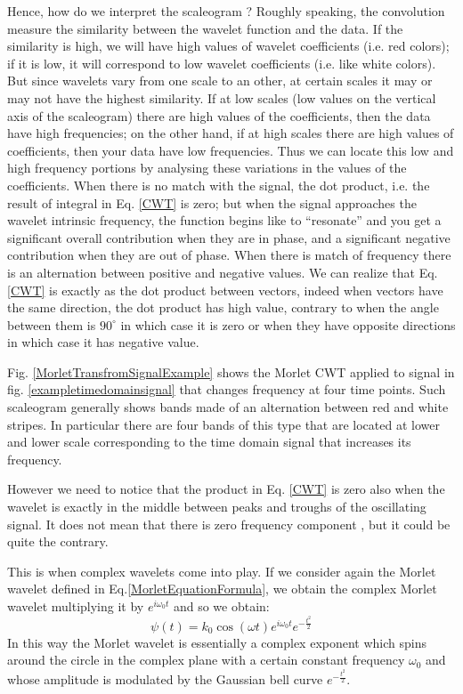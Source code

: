 \documentclass[12pt,a4paper]{report}
\begin{document}
Hence, how do we interpret the scaleogram ? Roughly speaking, the convolution measure the similarity between the wavelet function and the data. If the similarity is high, we will have high values of wavelet coefficients (i.e. red colors); if it is low, it will correspond to low wavelet coefficients (i.e. like white colors). But since wavelets vary from one scale to an other, at certain scales it may or may not have the highest similarity. If at low scales (low values on the vertical axis of the scaleogram) there are high values of the coefficients, then the data have high frequencies; on the other hand, if at high scales there are high values of coefficients, then your data have low frequencies. Thus we can locate this low and high frequency portions by analysing these variations in the values of the coefficients. When there is no match with the signal, the dot product, i.e. the result of integral in Eq. \ref{CWT} is zero; but when the signal approaches the wavelet intrinsic frequency, the function begins like to ``resonate'' and you get a significant overall contribution when they are in phase, and a significant negative contribution when they are out of phase. When there is match of frequency there is an alternation between positive and negative values. We can realize that Eq. \ref{CWT} is exactly as the dot product between vectors, indeed when vectors have the same direction, the dot product has high value, contrary to when the angle between them is $90^{\circ}$ in which case it is zero or when they have opposite directions in which case it has negative value.

Fig. \ref{MorletTransfromSignalExample} shows the Morlet CWT applied to signal in fig. \ref{exampletimedomainsignal} that changes frequency at four time points. Such scaleogram generally shows bands made of an alternation between red and white stripes. In particular there are four bands of this type that are located at lower and lower scale corresponding to the time domain signal that increases its frequency.

However we need to notice that the product in Eq. \ref{CWT} is zero also when the wavelet is exactly in the middle between peaks and troughs of the oscillating signal. It does not mean that there is zero frequency component , but it could be quite the contrary. 

This is when complex wavelets come into play. If we consider again the Morlet wavelet defined in Eq.\ref{MorletEquationFormula}, we obtain the complex Morlet wavelet multiplying it by $e^{i\omega_{0}t}$ and so we obtain:
\begin{equation}
 \psi(t) = k_{0}\cos(\omega t) e^{i\omega_{0}t} e^{-\frac{t^{2}}{2}}
\end{equation}
In this way the Morlet wavelet is essentially a complex exponent which spins around the circle in the complex plane with a certain constant frequency $\omega_{0}$ and whose amplitude is modulated by the Gaussian bell curve $e^{-\frac{t^{2}}{2}}$. 
\end{document}
